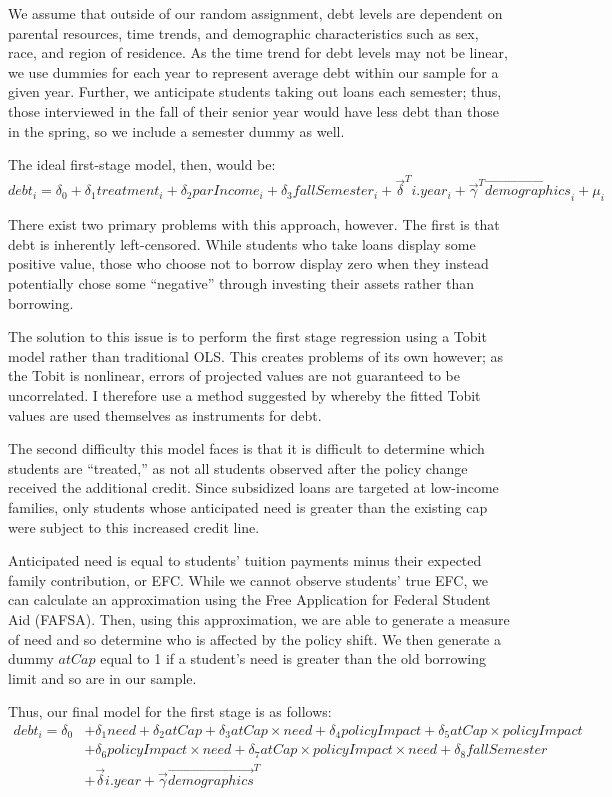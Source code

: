 \documentclass{article}
\begin{document}
	We assume that outside of our random assignment, debt levels are dependent on parental resources, time trends, and demographic characteristics such as sex, race, and region of residence. As the time trend for debt levels may not be linear, we use dummies for each year to represent average debt within our sample for a given year. Further, we anticipate students taking out loans each semester; thus, those interviewed in the fall of their senior year would have less debt than those in the spring, so we include a semester dummy as well.
	
	The ideal first-stage model, then, would be: $$debt_i = \delta_0 + \delta_1 treatment_i + \delta_2 parIncome_i + \delta_3 fallSemester_i + \vec{\delta}^T i.year_i + \vec{\gamma}^T \vec{demographics}_i + \mu_i$$
	
	There exist two primary problems with this approach, however. The first is that debt is inherently left-censored. While students who take loans display some positive value, those who choose not to borrow display zero when they instead potentially chose some ``negative'' through investing their assets rather than borrowing. 
	
	The solution to this issue is to perform the first stage regression using a Tobit model rather than traditional OLS. This creates problems of its own however; as the Tobit is nonlinear, errors of projected values are not guaranteed to be uncorrelated. I therefore use a method suggested by \textcite{angrist2009} whereby the fitted Tobit values are used themselves as instruments for debt. 
	
	The second difficulty this model faces is that it is difficult to determine which students are ``treated,'' as not all students observed after the policy change received the additional credit. Since subsidized loans are targeted at low-income families, only students whose anticipated need is greater than the existing cap were subject to this increased credit line. 
	
	Anticipated need is equal to students' tuition payments minus their expected family contribution, or EFC. While we cannot observe students' true EFC, we can calculate an approximation using the Free Application for Federal Student Aid (FAFSA). Then, using this approximation, we are able to generate a measure of need and so determine who is affected by the policy shift. We then generate a dummy $atCap$ equal to 1 if a student's need is greater than the old borrowing limit and so are in our sample. 
	
	Thus, our final model for the first stage is as follows: 
	\begin{align*}
	debt_i = \delta_0 &+ \delta_1 need + \delta_2 atCap + \delta_3 atCap \times need + \delta_4 policyImpact + \delta_5 atCap \times policyImpact\\
	 &+ \delta_6 policyImpact \times need + \delta_7 atCap \times policyImpact \times need + \delta_8 fallSemester \\
	 &+ \vec{\delta} i.year + \vec{\gamma} \vec{demographics}^T
	 \end{align*} 
	 
\end{document}
